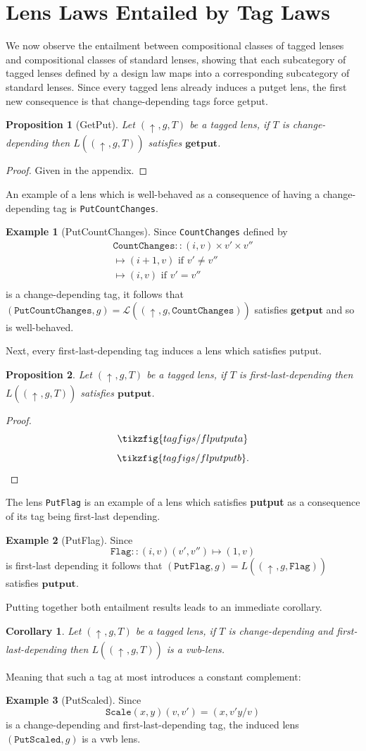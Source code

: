 \documentclass[a4paper,11pt]{article}
\newcommand{\putt}[1]{\mathbin{\uparrow_{#1}}}
\theoremstyle{definition}
\theoremstyle{plain}
\newtheorem{prop}{Proposition}
\theoremstyle{plain}
\newtheorem{corr}{Corollary}
\theoremstyle{definition}
\newtheorem{example}{Example}
\begin{document}
\section{Lens Laws Entailed by Tag Laws}
We now observe the entailment between compositional classes of tagged lenses and compositional classes of standard lenses, showing that each subcategory of tagged lenses defined by a design law maps into a corresponding subcategory of standard lenses. Since every tagged lens already induces a putget lens, the first new consequence is that change-depending tags force getput.
\begin{prop}[GetPut]
Let $(\putt{},g,T)$ be a tagged lens, if $T$ is change-depending then $L((\putt{},g,T))$ satisfies $\mathbf{getput}$. 
\end{prop}
\begin{proof}
Given in the appendix.
\end{proof}
An example of a lens which is well-behaved as a consequence of having a change-depending tag is \texttt{PutCountChanges}.
\begin{example}[PutCountChanges]
Since \texttt{CountChanges} defined by
\begin{align*}
    \texttt{CountChanges}:: (i,v) \times v' \times v'' \\
    \mapsto (i+1,v) \textrm{ if } v' \neq v'' \\
    \mapsto (i,v) \textrm{ if } v' = v'' \\
\end{align*} is a change-depending tag, it follows that $(\texttt{PutCountChanges},g) = \mathcal{L}((\putt{},g,\texttt{CountChanges}))$ satisfies $\textbf{getput}$ and so is well-behaved.
\end{example}
Next, every first-last-depending tag induces a lens which satisfies putput.
\begin{prop}
Let $(\putt{},g,T)$ be a tagged lens, if $T$ is first-last-depending then $L((\putt{},g,T))$ satisfies $\mathbf{putput}$. 
\end{prop}
\begin{proof}
\[\tikzfig{tagfigs/flputputa}\]
\[\tikzfig{tagfigs/flputputb}.\]
\end{proof}
The lens \texttt{PutFlag} is an example of a lens which satisfies \textbf{putput} as a consequence of its tag being first-last depending.
\begin{example}[PutFlag]
Since
\[\texttt{Flag}:: (i,v) (v',v'') \mapsto (1,v) \]
is first-last depending it follows that $(\texttt{PutFlag},g) = L((\putt{},g,\texttt{Flag}))$ satisfies $\textbf{putput}$.
\end{example}
Putting together both entailment results leads to an immediate corollary.
\begin{corr}
Let $(\putt{},g,T)$ be a tagged lens, if $T$ is change-depending and first-last-depending then $L((\putt{},g,T))$ is a vwb-lens.
\end{corr}
Meaning that such a tag at most introduces a constant complement:
\begin{example}[PutScaled]
Since
\[\texttt{Scale} (x,y) (v,v') = (x,v' y / v) \]
is a change-depending and first-last-depending tag, the induced lens $(\texttt{PutScaled},g)$ is a vwb lens.
\end{example}
\end{document}
